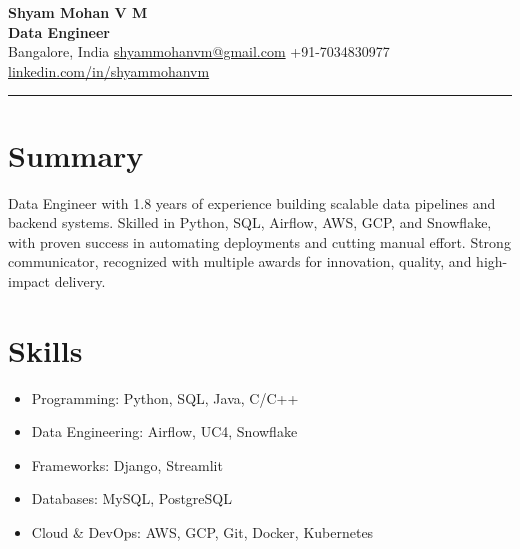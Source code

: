 \documentclass[11pt,a4paper]{article}
\begin{document}
\begin{center}
    {\LARGE \textbf{Shyam Mohan V M}} \\[4pt]
    {\normalsize \textbf{Data Engineer}} \\[6pt]
    Bangalore, India \textbar{} 
\href{mailto:shyammohanvm@gmail.com}{shyammohanvm@gmail.com} \textbar{} 
+91-7034830977 \textbar{} 
\href{https://www.linkedin.com/in/shyammohanvm/}{linkedin.com/in/shyammohanvm}
\end{center}
\hrule
\vspace{0.5cm}
\section*{Summary}
Data Engineer with 1.8 years of experience building scalable data pipelines and backend systems. Skilled in Python, SQL, Airflow, AWS, GCP, and Snowflake, with proven success in automating deployments and cutting manual effort. Strong communicator, recognized with multiple awards for innovation, quality, and high-impact delivery.
\section*{Skills}
\begin{itemize}
    \item Programming: Python, SQL, Java, C/C++
    \item Data Engineering: Airflow, UC4, Snowflake
    \item Frameworks: Django, Streamlit
    \item Databases: MySQL, PostgreSQL
    \item Cloud \& DevOps: AWS, GCP, Git, Docker, Kubernetes
\end{itemize}

\end{document}
